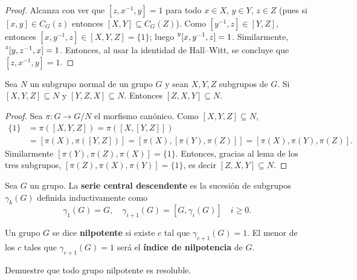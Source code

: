 \begin{proof}
	Alcanza con ver que $[z,x^{-1},y]=1$ para todo $x\in X$, $y\in Y$, $z\in Z$
	(pues si $[x,y]\in C_G(z)$ entonces %
	$[X,Y]\subseteq C_G(Z)$). Como $[y^{-1},z]\in [Y,Z]$, entonces
	$[x,y^{-1},z]\in [X,Y,Z]=\{1\}$; luego $\prescript{y}{}[x,y^{-1},z]=1$.
	Similarmente, $\prescript{z}{}[y,z^{-1},x]=1$. Entonces, al usar la
	identidad de Hall--Witt, se concluye que 
	$[z,x^{-1},y]=1$.
\end{proof}

\begin{lemma}
	\label{lemma:3subgrupos_general}
	Sea $N$ un subgrupo normal de un grupo $G$ y sean $X,Y,Z$
	subgrupos de $G$. Si $[X,Y,Z]\subseteq N$ y $[Y,Z,X]\subseteq N$. Entonces
	$[Z,X,Y]\subseteq N$.
\end{lemma}

\begin{proof}
	Sea $\pi\colon G\to G/N$ el morfismo canónico. Como $[X,Y,Z]\subseteq N$, 
	\begin{align*}
		\{1\}&=\pi([X,Y,Z])=\pi([ X,[Y,Z]])\\
		&=[\pi(X),\pi([Y,Z])]=[ \pi(X),[\pi(Y),\pi(Z)]]=[\pi(X),\pi(Y),\pi(Z)]. 
	\end{align*}
	Similarmente $[\pi(Y),\pi(Z),\pi(X)]=\{1\}$. Entonces, gracias al lema de los
	tres subgrupos, $[\pi(Z),\pi(X),\pi(Y)]=\{1\}$, es decir
	$[Z,X,Y]\subseteq N$.
\end{proof}


\begin{definition}
	Sea $G$ un grupo. La \textbf{serie central descendente} es la sucesión de
	subgrupos $\gamma_k(G)$ definida inductivamente como
	\[
		\gamma_1(G)=G,\quad
		\gamma_{i+1}(G)=[G,\gamma_i(G)]\quad i\geq 0.
	\]
\end{definition}

\begin{definition}
	Un grupo $G$ se dice \textbf{nilpotente} si existe $c$ tal que
	$\gamma_{c+1}(G)=1$. El menor de los $c$ tales que $\gamma_{c+1}(G)=1$ será
	el \textbf{índice de nilpotencia} de $G$.
\end{definition}

\begin{exercise}
	Demuestre que todo grupo nilpotente es resoluble.
\end{exercise}

